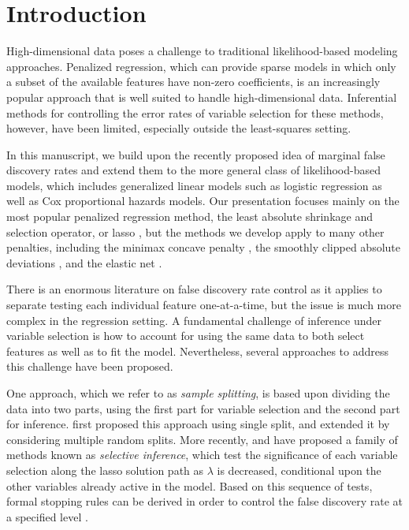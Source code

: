 \section{Introduction}

High-dimensional data poses a challenge to traditional likelihood-based modeling approaches.  Penalized regression, which can provide sparse models in which only a subset of the available features have non-zero coefficients, is an increasingly popular approach that is well suited to handle high-dimensional data.  Inferential methods for controlling the error rates of variable selection for these methods, however, have been limited, especially outside the least-squares setting.

In this manuscript, we build upon the recently proposed idea of marginal false discovery rates and extend them to the more general class of likelihood-based models, which includes generalized linear models such as logistic regression as well as Cox proportional hazards models.  Our presentation focuses mainly on the most popular penalized regression method, the least absolute shrinkage and selection operator, or lasso \citep{tibshirani_1996}, but the methods we develop apply to many other penalties, including the minimax concave penalty \citep[MCP; ][]{MCP}, the smoothly clipped absolute deviations \citep[SCAD; ][]{SCAD}, and the elastic net \citep{Elastic_Net}.

There is an enormous literature on false discovery rate control as it applies to separate testing each individual feature one-at-a-time, but the issue is much more complex in the regression setting.  A fundamental challenge of inference under variable selection is how to account for using the same data to both select features as well as to fit the model.  Nevertheless, several approaches to address this challenge have been proposed.

One approach, which we refer to as {\em sample splitting}, is based upon dividing the data into two parts, using the first part for variable selection and the second part for inference. \citet{Sample_Splitting} first proposed this approach using single split, and \citet{Meinshausen2009} extended it by considering multiple random splits.  More recently, \citet{CovTest} and \citet{Selective_Inference} have proposed a family of methods known as {\em selective inference}, which test the significance of each variable selection along the lasso solution path as $\lambda$ is decreased, conditional upon the other variables already active in the model. Based on this sequence of tests, formal stopping rules can be derived in order to control the false discovery rate at a specified level \citep{GSell2016}.

